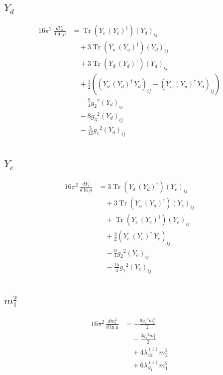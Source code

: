 \documentclass[10pt,a4paper]{article}
\begin{document}
\subsection*{$Y_d$}
\begin{align*}
16\pi^2\,\frac{d Y_d}{d\ln\mu} &=\operatorname{Tr}\!\left({Y_e}\,\left({Y_e}\right)^{\dagger}\right) \left({Y_d}\right)_{ij} \\
&\quad +3 \operatorname{Tr}\!\left({Y_u}\,\left({Y_u}\right)^{\dagger}\right) \left({Y_d}\right)_{ij} \\
&\quad +3 \operatorname{Tr}\!\left({Y_d}\,\left({Y_d}\right)^{\dagger}\right) \left({Y_d}\right)_{ij} \\
&\quad +\frac{3}{2} (\left({Y_d}\,\left({Y_d}\right)^{\dagger}\,{Y_d}\right)_{ij}-\left({Y_u}\,\left({Y_u}\right)^{\dagger}\,{Y_d}\right)_{ij}) \\
&\quad -\frac{9}{4} {g_2}^2 \left({Y_d}\right)_{ij} \\
&\quad -8 {g_3}^2 \left({Y_d}\right)_{ij} \\
&\quad -\frac{5}{12} {g_1}^2 \left({Y_d}\right)_{ij} \\
\end{align*}
\subsection*{$Y_e$}
\begin{align*}
16\pi^2\,\frac{d Y_e}{d\ln\mu} &=3 \operatorname{Tr}\!\left({Y_d}\,\left({Y_d}\right)^{\dagger}\right) \left({Y_e}\right)_{ij} \\
&\quad +3 \operatorname{Tr}\!\left({Y_u}\,\left({Y_u}\right)^{\dagger}\right) \left({Y_e}\right)_{ij} \\
&\quad +\operatorname{Tr}\!\left({Y_e}\,\left({Y_e}\right)^{\dagger}\right) \left({Y_e}\right)_{ij} \\
&\quad +\frac{3}{2} \left({Y_e}\,\left({Y_e}\right)^{\dagger}\,{Y_e}\right)_{ij} \\
&\quad -\frac{9}{4} {g_2}^2 \left({Y_e}\right)_{ij} \\
&\quad -\frac{15}{4} {g_1}^2 \left({Y_e}\right)_{ij} \\
\end{align*}
\subsection*{$m_1^2$}
\begin{align*}
16\pi^2\,\frac{d m_1^2}{d\ln\mu} &=-\frac{9 {g_2}^2 {m_1^2}}{2} \\
&\quad -\frac{3 {g_1}^2 {m_1^2}}{2} \\
&\quad +4 {\lambda_{12}^{(1)}} {m_2^2} \\
&\quad +6 {\lambda_{S_1}^{(1)}} {m_1^2} \\
\end{align*}
\end{document}

